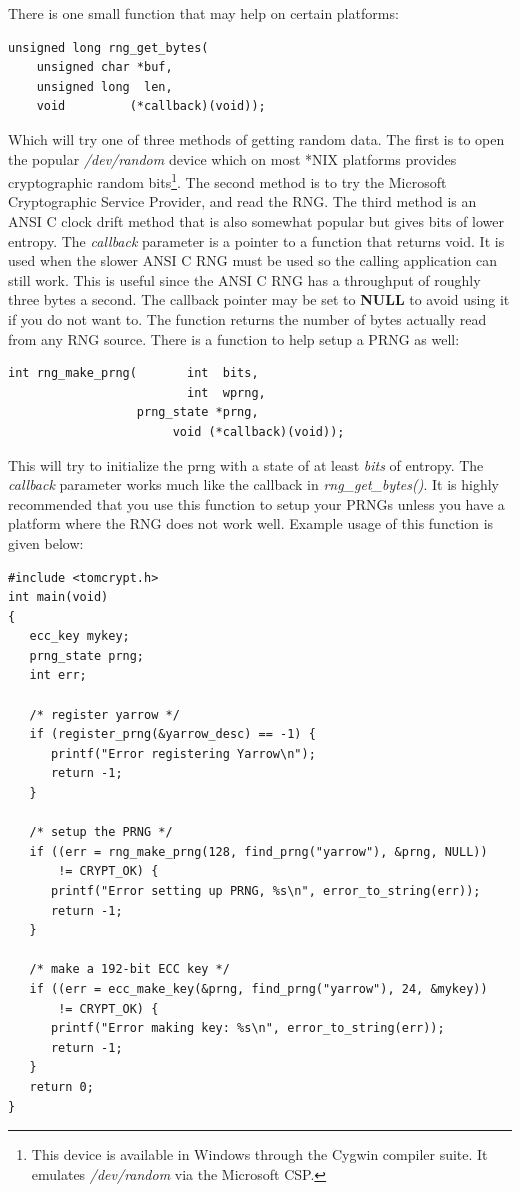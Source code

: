 \documentclass[synpaper]{book}
\begin{document}
There is one small function that may help on certain platforms:
\begin{verbatim}
unsigned long rng_get_bytes(
    unsigned char *buf,
    unsigned long  len,
    void         (*callback)(void));
\end{verbatim}

Which will try one of three methods of getting random data.  The first is to open the popular \textit{/dev/random} device which
on most *NIX platforms provides cryptographic random bits\footnote{This device is available in Windows through the Cygwin compiler suite.  It emulates \textit{/dev/random} via the Microsoft CSP.}.
The second method is to try the Microsoft Cryptographic Service Provider, and read the RNG.  The third method is an ANSI C
clock drift method that is also somewhat popular but gives bits of lower entropy.  The \textit{callback} parameter is a pointer to a function that returns void.  It is
used when the slower ANSI C RNG must be used so the calling application can still work.  This is useful since the ANSI C RNG has a throughput of roughly three
bytes a second.  The callback pointer may be set to {\bf NULL} to avoid using it if you do not want to.  The function returns the number of bytes actually read from
any RNG source.  There is a function to help setup a PRNG as well:
\begin{verbatim}
int rng_make_prng(       int  bits,
                         int  wprng,
                  prng_state *prng,
                       void (*callback)(void));
\end{verbatim}
This will try to initialize the prng with a state of at least \textit{bits} of entropy.  The \textit{callback} parameter works much like
the callback in \textit{rng\_get\_bytes()}.  It is highly recommended that you use this function to setup your PRNGs unless you have a
platform where the RNG does not work well.  Example usage of this function is given below:

\begin{small}
\begin{verbatim}
#include <tomcrypt.h>
int main(void)
{
   ecc_key mykey;
   prng_state prng;
   int err;

   /* register yarrow */
   if (register_prng(&yarrow_desc) == -1) {
      printf("Error registering Yarrow\n");
      return -1;
   }

   /* setup the PRNG */
   if ((err = rng_make_prng(128, find_prng("yarrow"), &prng, NULL))
       != CRYPT_OK) {
      printf("Error setting up PRNG, %s\n", error_to_string(err));
      return -1;
   }

   /* make a 192-bit ECC key */
   if ((err = ecc_make_key(&prng, find_prng("yarrow"), 24, &mykey))
       != CRYPT_OK) {
      printf("Error making key: %s\n", error_to_string(err));
      return -1;
   }
   return 0;
}
\end{verbatim}
\end{small}
\end{document}

